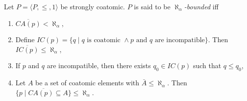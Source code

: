 Let $P = \langle P, \leq, 1 \rangle$ be strongly coatomic. $P$ is said to be \emph{$\aleph_\alpha$-bounded} iff
\begin{enumerate}
\item $\overline{CA(p)} < \aleph_\alpha$,
\item Define $IC(p) = \{q \mid q \text{ is coatomic } \land p \text{ and } q \text{ are incompatible}\}$. Then $\overline{IC(p)} \leq \aleph_\alpha$,
\item If $p$ and $q$ are incompatible, then there exists $q_0 \in IC(p)$ such that $q \leq q_0$,
\item Let $A$ be a set of coatomic elements with $\bar{A} \leq \aleph_\alpha$. Then $\overline{\{p \mid CA(p) \subseteq A\}} \leq \aleph_\alpha$.
\end{enumerate}
